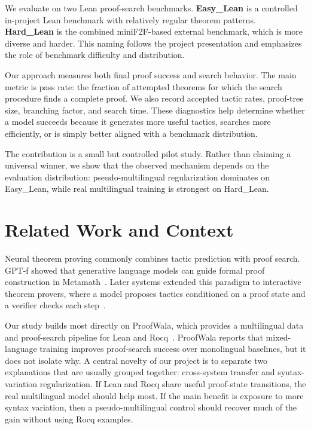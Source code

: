 \documentclass{article} %
\begin{document}
We evaluate on two Lean proof-search benchmarks.  \textbf{Easy\_Lean} is a controlled in-project Lean benchmark with relatively regular theorem patterns.  \textbf{Hard\_Lean} is the combined miniF2F-based external benchmark, which is more diverse and harder.  This naming follows the project presentation and emphasizes the role of benchmark difficulty and distribution.

Our approach measures both final proof success and search behavior.  The main metric is pass rate: the fraction of attempted theorems for which the search procedure finds a complete proof.  We also record accepted tactic rates, proof-tree size, branching factor, and search time.  These diagnostics help determine whether a model succeeds because it generates more useful tactics, searches more efficiently, or is simply better aligned with a benchmark distribution.

The contribution is a small but controlled pilot study.  Rather than claiming a universal winner, we show that the observed mechanism depends on the evaluation distribution: pseudo-multilingual regularization dominates on Easy\_Lean, while real multilingual training is strongest on Hard\_Lean.


\section{Related Work and Context}

Neural theorem proving commonly combines tactic prediction with proof search.  GPT-f showed that generative language models can guide formal proof construction in Metamath~\citep{polu2020generative}.  Later systems extended this paradigm to interactive theorem provers, where a model proposes tactics conditioned on a proof state and a verifier checks each step~\citep{huang2018gamepad,yang2019coqgym,blaauwbroek2020tactic,yang2023leandojo}.

Our study builds most directly on ProofWala, which provides a multilingual data and proof-search pipeline for Lean and Rocq~\citep{thakur2025proofwala}.  ProofWala reports that mixed-language training improves proof-search success over monolingual baselines, but it does not isolate why.  A central novelty of our project is to separate two explanations that are usually grouped together: cross-system transfer and syntax-variation regularization.  If Lean and Rocq share useful proof-state transitions, the real multilingual model should help most.  If the main benefit is exposure to more syntax variation, then a pseudo-multilingual control should recover much of the gain without using Rocq examples.
\end{document}
